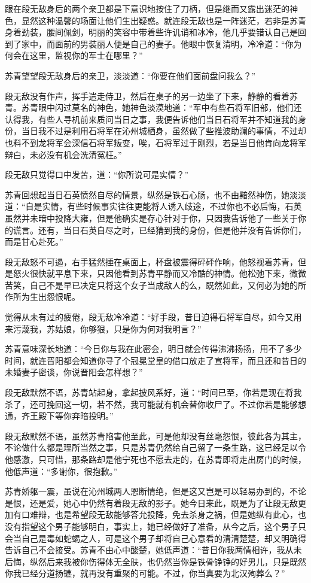 跟在段无敌身后的两个亲卫都是下意识地按住了刀柄，但是继而又露出迷茫的神色，显然这种温馨的场面让他们生出疑惑。就连段无敌也是一阵迷茫，若非是苏青身着劲装，腰间佩剑，明丽的笑容中带着些许讥诮和冰冷，他几乎要错认自己是回到了家中，而面前的男装丽人便是自己的妻子。他眼中恢复清明，冷冷道：“你为何会在这里，监视你的军士在哪里？”

苏青望望段无敌身后的亲卫，淡淡道：“你要在他们面前盘问我么？”

段无敌没有作声，挥手遣走侍卫，然后在桌子的另一边坐了下来，静静的看着苏青。苏青眼中闪过莫名的神色，她神色淡漠地道：“军中有些石将军旧部，他们还认得我，有些人寻机前来质问当日之事，我便告诉他们当日石将军并不知道我的身份，当日我不过是利用石将军在沁州城栖身，虽然做了些推波助澜的事情，不过却也料不到龙将军会深信石将军叛变，唉，石将军过于刚烈，若是当日他肯向龙将军辩白，未必没有机会洗清冤枉。”

段无敌只觉得口中发苦，道：“你所说可是实情？”

苏青回想起当日石英愤然自尽的情景，纵然是铁石心肠，也不由黯然神伤，她淡淡道：“自是实情，有些时候事实往往更能将人诱入歧途，不过你也不必后悔，石英虽然并未暗中投降大雍，但是他确实是存心针对于你，只因我告诉他了一些关于你的谎言。还有，当日石英自尽之时，已经猜到我的身份，但是他并没有告诉你们，而是甘心赴死。”

段无敌怒不可遏，右手猛然捶在桌面上，杯盘被震得砰砰作响，他怒视着苏青，但是怒火很快就平息下来，只因他看到苏青平静而又冷酷的神情。他松弛下来，微微苦笑，自己不是早已决定只将这个女子当成敌人的么，既然如此，又何必为她的所作所为生出怨恨呢。

觉得从未有过的疲倦，段无敌冷冷道：“好手段，昔日迫得石将军自尽，如今又用来污蔑我，苏姑娘，你够狠，只是你为何对我明言？”

苏青意味深长地道：“今日你与我在此密会，明日就会传得沸沸扬扬，用不了多少时间，就连晋阳都会知道你寻了个冠冕堂皇的借口放走了宣将军，而且还和昔日的未婚妻子密谈，你说晋阳会怎样想？”

段无敌默然不语，苏青站起身，拿起披风系好，道：“时间已至，你若是现在将我杀了，还可挽回这一切，若不然，我可能就有机会替你收尸了。不过你若是能够想通，齐王殿下等你弃暗投明。”

段无敌默然不语，虽然苏青陷害他至此，可是他却没有丝毫怨恨，彼此各为其主，不论做什么都是理所当然之事，只是苏青仍然给自己留了一条生路，这已经足以令他感激，只可惜，那条路却是他宁死也不愿去走的，在苏青即将走出房门的时候，他低声道：“多谢你，很抱歉。”

苏青娇躯一震，虽说在沁州城两人恩断情绝，但是这又岂是可以轻易办到的，不论是恨，还是爱，她心中仍然有着段无敌的影子。她今日来此，既是为了让段无敌更加有口难辩，也是希望段无敌能够答允投降，免去杀身之祸，但是她纵有此心，也没有指望这个男子能够明白，事实上，她已经做好了准备，从今之后，这个男子只会当自己是毒如蛇蝎之人，可是这个男子却将自己心意看的清清楚楚，却又明确得告诉自己不会接受。苏青不由心中酸楚，她低声道：“昔日你我两情相许，我从未后悔，纵然后来我被你伤得体无全肤，也仍然当你是铁骨铮铮的好男儿，只是既然你我已经分道扬镳，就再没有重聚的可能。不过，你当真要为北汉殉葬么？”

